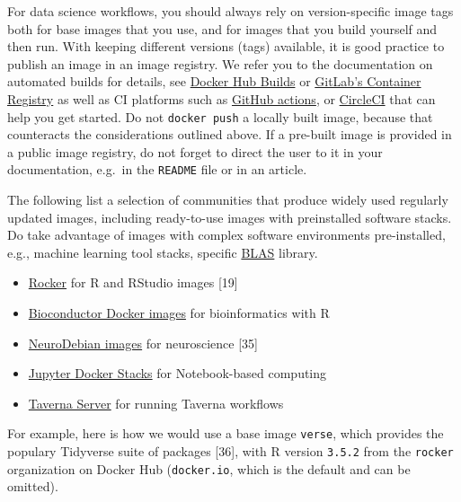 \documentclass[10pt,letterpaper]{article}
\providecommand{\tightlist}{%
  \setlength{\itemsep}{0pt}\setlength{\parskip}{0pt}}
\begin{document}
For data science workflows, you should always rely on version-specific
image tags both for base images that you use, and for images that you
build yourself and then run. With keeping different versions (tags)
available, it is good practice to publish an image in an image registry.
We refer you to the documentation on automated builds for details, see
\href{https://docs.docker.com/docker-hub/builds/}{Docker Hub Builds} or
\href{https://docs.gitlab.com/ee/user/packages/container_registry/index.html\#build-and-push-images}{GitLab's
Container Registry} as well as CI platforms such as
\href{https://github.com/actions/starter-workflows/tree/master/ci}{GitHub
actions}, or
\href{https://circleci.com/orbs/registry/orb/circleci/docker\#commands-build}{CircleCI}
that can help you get started. Do not \texttt{docker\ push} a locally
built image, because that counteracts the considerations outlined above.
If a pre-built image is provided in a public image registry, do not
forget to direct the user to it in your documentation, e.g.~in the
\texttt{README} file or in an article.

The following list a selection of communities that produce widely used
regularly updated images, including ready-to-use images with
preinstalled software stacks. Do take advantage of images with complex
software environments pre-installed, e.g., machine learning tool stacks,
specific
\href{https://en.wikipedia.org/wiki/Basic_Linear_Algebra_Subprograms}{BLAS}
library.

\begin{itemize}
\tightlist
\item
  \href{https://www.rocker-project.org/}{Rocker} for R and RStudio
  images {[}19{]}
\item
  \href{https://bioconductor.org/help/docker/}{Bioconductor Docker
  images} for bioinformatics with R
\item
  \href{https://hub.docker.com/_/neurodebian}{NeuroDebian images} for
  neuroscience {[}35{]}
\item
  \href{https://jupyter-docker-stacks.readthedocs.io/en/latest/index.html}{Jupyter
  Docker Stacks} for Notebook-based computing
\item
  \href{https://hub.docker.com/r/taverna/taverna-server}{Taverna Server}
  for running Taverna workflows
\end{itemize}

For example, here is how we would use a base image \texttt{verse}, which
provides the populary Tidyverse suite of packages {[}36{]}, with R
version \texttt{3.5.2} from the \texttt{rocker} organization on Docker
Hub (\texttt{docker.io}, which is the default and can be omitted).
\end{document}

